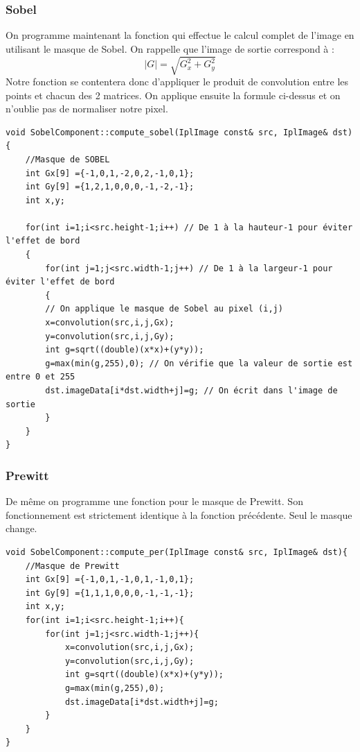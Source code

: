 \subsubsection{Sobel}
On programme maintenant la fonction qui effectue le calcul complet de l'image en utilisant le masque de Sobel. On rappelle que l'image de sortie correspond à :
\begin{equation}
|G| = \sqrt{G_x^2 + G_y^2}
\end{equation}
Notre fonction se contentera donc d'appliquer le produit de convolution entre les points et chacun des 2 matrices. On applique ensuite la formule ci-dessus et on n'oublie pas de normaliser notre pixel.
\cpp
\begin{lstlisting}
void SobelComponent::compute_sobel(IplImage const& src, IplImage& dst)
{  
	//Masque de SOBEL
	int Gx[9] ={-1,0,1,-2,0,2,-1,0,1};
	int Gy[9] ={1,2,1,0,0,0,-1,-2,-1};
	int x,y;

	for(int i=1;i<src.height-1;i++) // De 1 à la hauteur-1 pour éviter l'effet de bord
	{
		for(int j=1;j<src.width-1;j++) // De 1 à la largeur-1 pour éviter l'effet de bord
		{
		// On applique le masque de Sobel au pixel (i,j)
		x=convolution(src,i,j,Gx);
		y=convolution(src,i,j,Gy);
		int g=sqrt((double)(x*x)+(y*y));
		g=max(min(g,255),0); // On vérifie que la valeur de sortie est entre 0 et 255
		dst.imageData[i*dst.width+j]=g; // On écrit dans l'image de sortie
		}
	}
}
\end{lstlisting}

\subsubsection{Prewitt}
De même on programme une fonction pour le masque de Prewitt. Son fonctionnement est strictement identique à la fonction précédente. Seul le masque change.
\cpp
\begin{lstlisting}
void SobelComponent::compute_per(IplImage const& src, IplImage& dst){ 
	//Masque de Prewitt
	int Gx[9] ={-1,0,1,-1,0,1,-1,0,1};
	int Gy[9] ={1,1,1,0,0,0,-1,-1,-1};
	int x,y;
	for(int i=1;i<src.height-1;i++){
		for(int j=1;j<src.width-1;j++){
			x=convolution(src,i,j,Gx);
			y=convolution(src,i,j,Gy);
			int g=sqrt((double)(x*x)+(y*y));
			g=max(min(g,255),0);
			dst.imageData[i*dst.width+j]=g;
		}
	}
}
\end{lstlisting}

